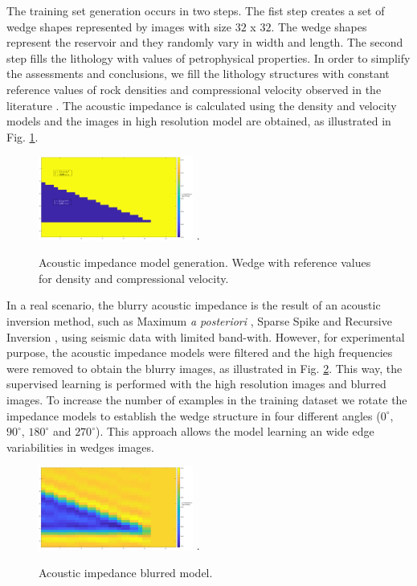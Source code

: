 \documentclass[conference]{IEEEtran}
\begin{document}
The training set generation occurs in two steps.
The fist step creates a set of wedge shapes represented
by images with size $32$ x $32$. The wedge shapes represent the reservoir and they
randomly vary in width and length. The second step fills the lithology with values of petrophysical properties.
In order to simplify the assessments and conclusions, we fill the lithology structures with constant
reference values of rock densities and compressional velocity observed in the literature \cite{Mavko2009}.
The acoustic impedance is calculated using the density and velocity models and the images in high
resolution model are obtained, as illustrated in  Fig. \ref{fig_lithology}.
\begin{figure}[!t]
\centering
\includegraphics[width=2.0in]{Figs/Image_Paper}
\DeclareGraphicsExtensions.
\caption{Acoustic impedance model generation. Wedge with reference values for density and compressional velocity.}
\label{fig_lithology}
\end{figure}

In a real scenario, the blurry acoustic impedance is the
result of an acoustic inversion method, such as Maximum \textit{a posteriori} \cite{Buland2003,Figueiredo2012}, Sparse Spike \cite{Debeye1990} 
and Recursive Inversion \cite{Chopra2001}, using seismic data with limited band-with.
However, for experimental purpose, the acoustic impedance models were filtered
and the high frequencies were removed to obtain the blurry images, as illustrated in Fig. \ref{fig_blur}.
This way, the supervised learning is performed with the high resolution images and blurred images.
To increase the number of examples in the training dataset we rotate
the impedance models to establish the wedge structure in four different angles
($0^{\circ}$, $90^{\circ}$, $180^{\circ}$ and $270^{\circ}$).
This approach allows the model learning an wide edge variabilities in wedges images.
\begin{figure}[!t]
\centering
\includegraphics[width=2.0in]{Figs/Image_Paper_blurred}
\DeclareGraphicsExtensions.
\caption{Acoustic impedance blurred model.}
\label{fig_blur}
\end{figure}
\end{document}
